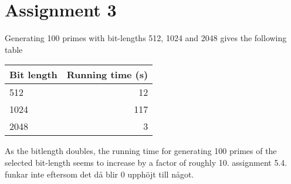 \documentclass{article}
\begin{document}

\section{Assignment 3}


Generating 100 primes with bit-lengths 512, 1024 and 2048 gives the following table

\begin{tabular}{ l | r }
	Bit length & Running time (s)\\ \hline
	512 & 12 \\
	1024 & 117 \\
	2048 & 3 \\
\end{tabular}

As the bitlength doubles, the running time for generating 100 primes of the selected bit-length seems to increase by a factor of roughly 10.
assignment 5.4. funkar inte eftersom det då blir 0 upphöjt till något.
\end{document}
